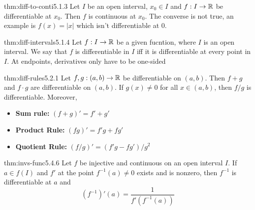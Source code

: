 \documentclass[landscape, 8pt]{extarticle}
\begin{document}
\begin{multicols}{3}

\begin{thm}{thm:diff-to-conti}{5.1.3}
    Let $I$ be an open interval, $x_{0}\in I$ and $f:I\to \mathbb{R}$ be differentiable at $x_{0}$. Then $f$ is continuous at $x_{0}$. The converse is not true, an example is $f(x)=\lvert x\rvert $ which isn't differentiable at $0$.
\end{thm}
\vspace{-5pt}

\begin{thm}{thm:diff-intervals}{5.1.4}
    Let $f:I\to \mathbb{R}$ be a given fucntion, where $I$ is an open interval. We say that $f$ is differentiable in $I$ iff it is differentiable at every point in $I$.
    At endpoints, derivatives only have to be one-sided
\end{thm}
\vspace{-5pt}

\begin{thm}{thm:diff-rules}{5.2.1}
    Let $f,g:(a,b)\to \mathbb{R}$ be differentiable on $(a,b)$. Then $f+g$ and $f\cdot g$ are differentiable on $(a,b)$. If $g(x)\ne 0$ for all $x \in (a,b)$, then $f/g$ is differentiable. Moreover,
    \vspace{-5pt}
    \renewcommand\labelitemi{\tiny$\bullet$}
    \begin{itemize}
        \setlength\itemsep{0em}
        \item \textbf{Sum rule:} $(f+g)' = f' + g'$
        \item \textbf{Product Rule:} $(fg)'=f'g + fg'$
        \item \textbf{Quotient Rule:} $\left(f / g\right)' =(f'g - fg') /g^{2}$
    \end{itemize}
\end{thm}
\vspace{-5pt}

\begin{thm}{thm:invs-func}{5.4.6}
    Let $f$ be injective and continuous on an open interval $I$. If $a\in f(I)$ and $f'$ at the point $f^{-1}(a)\ne 0$ exists and is nonzero, then $f^{-1}$ is differentiable at $a$ and
    \[(f^{-1})'(a)= \frac{1}{f'(f^{-1}(a))}\]
\end{thm}
\vspace{-5pt}



\end{multicols}
\end{document}
